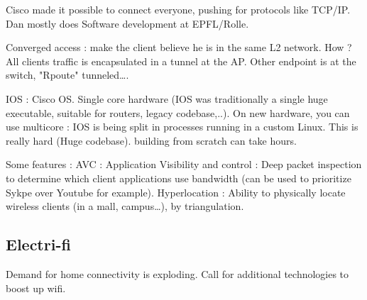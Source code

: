 \documentclass[12pt,a4paper]{article}
\begin{document}
Cisco made it possible to connect everyone, pushing for protocols like TCP/IP. Dan mostly does Software development at EPFL/Rolle.

Converged access : make the client believe he is in the same L2 network. How ? All clients traffic is encapsulated in a tunnel at the AP. Other endpoint is at the switch, "Rpoute" tunneled\ldots.

IOS : Cisco OS. Single core hardware (IOS was traditionally a single huge executable, suitable for routers, legacy codebase,..). On new hardware, you can use multicore : IOS is being split in processes running in a custom Linux. This is really hard (Huge codebase). building from scratch can take hours. 

Some features : AVC : Application Visibility and control : Deep packet inspection to determine which client applications use bandwidth (can be used to prioritize Sykpe over Youtube for example). Hyperlocation : Ability to physically locate wireless clients (in a mall, campus\ldots), by triangulation. 

\subsection{Electri-fi}
Demand for home connectivity is exploding. Call for additional technologies to boost up wifi. 	


\appendix
\end{document}
